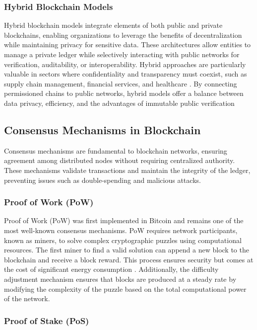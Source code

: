 \documentclass[final]{rc-book-2.14}
\begin{document}
\subsubsection{Hybrid Blockchain Models}

Hybrid blockchain models integrate elements of both public and private blockchains, enabling organizations to leverage the benefits of decentralization while maintaining privacy for sensitive data. These architectures allow entities to manage a private ledger while selectively interacting with public networks for verification, auditability, or interoperability. Hybrid approaches are particularly valuable in sectors where confidentiality and transparency must coexist, such as supply chain management, financial services, and healthcare \cite{ahmed20222}. By connecting permissioned chains to public networks, hybrid models offer a balance between data privacy, efficiency, and the advantages of immutable public verification

\subsection{Consensus Mechanisms in Blockchain}

Consensus mechanisms are fundamental to blockchain networks, ensuring agreement among distributed nodes without requiring centralized authority. These mechanisms validate transactions and maintain the integrity of the ledger, preventing issues such as double-spending and malicious attacks.

\subsubsection{Proof of Work (PoW)}

Proof of Work (PoW) was first implemented in Bitcoin \cite{nakamoto2008bitcoin} and remains one of the most well-known consensus mechanisms. PoW requires network participants, known as miners, to solve complex cryptographic puzzles using computational resources. The first miner to find a valid solution can append a new block to the blockchain and receive a block reward. This process ensures security but comes at the cost of significant energy consumption \cite{narayanan2016bitcoin, sedlmeir_energy_2020}. Additionally, the difficulty adjustment mechanism ensures that blocks are produced at a steady rate by modifying the complexity of the puzzle based on the total computational power of the network.

\subsubsection{Proof of Stake (PoS)}
\end{document}
